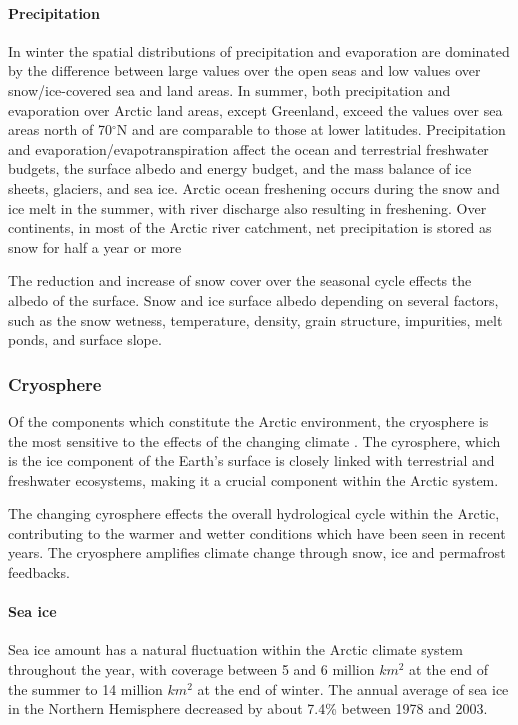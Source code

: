 \documentclass[12pt, oneside]{article}
\begin{document}
\paragraph{Precipitation}
In winter the spatial distributions of precipitation and evaporation are dominated by the difference between large values over the open seas and low values over snow/ice-covered sea and land areas. In summer, both precipitation and evaporation over Arctic land areas, except Greenland, exceed the values over sea areas north of 70$^{\circ}$N and are comparable to those at lower latitudes. Precipitation and evaporation/evapotranspiration affect the ocean and terrestrial freshwater budgets, the surface albedo and energy budget, and the mass balance of ice sheets, glaciers, and sea ice. Arctic ocean freshening occurs during the snow and ice melt in the summer, with river discharge also resulting in freshening. Over continents, in most of the Arctic river catchment, net precipitation is stored as snow for half a year or more

The reduction and increase of snow cover over the seasonal cycle effects the albedo of the surface. Snow and ice surface albedo depending on several factors, such as the snow wetness, temperature, density, grain structure, impurities, melt ponds, and surface slope. 

\subsubsection{Cryosphere}
Of the components which constitute the Arctic environment, the cryosphere is the most sensitive to the effects of the changing climate \cite{rinke2019trends}. The cyrosphere, which is the ice component of the Earth's surface is closely linked with terrestrial and freshwater ecosystems, making it a crucial component within the Arctic system.

The changing cyrosphere effects the overall hydrological cycle within the Arctic, contributing to the warmer and wetter conditions which have been seen in recent years. The cryosphere amplifies climate change through snow, ice and permafrost feedbacks. 




\paragraph{Sea ice}
Sea ice amount has a natural fluctuation within the Arctic climate system throughout the year, with coverage between 5 and 6 million $km^2$ at the end of the summer to 14 million $km^2$ at the end of winter. The annual average of sea ice in the Northern Hemisphere decreased by about 7.4\% between 1978 and 2003. 
\end{document}
